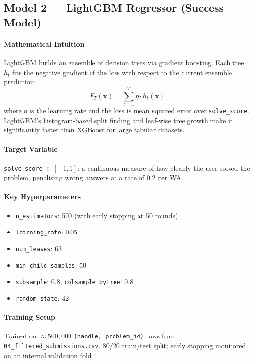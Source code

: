 \documentclass[12pt,a4paper]{article}
\begin{document}
\subsection*{Model 2 --- LightGBM Regressor (Success Model)}

\paragraph{Mathematical Intuition}
LightGBM builds an ensemble of decision trees via gradient boosting. Each tree
$h_t$ fits the negative gradient of the loss with respect to the current
ensemble prediction:
\[
    F_T(\mathbf{x}) = \sum_{t=1}^{T} \eta \cdot h_t(\mathbf{x})
\]
where $\eta$ is the learning rate and the loss is mean squared error over
\texttt{solve\_score}. LightGBM's histogram-based split finding and
leaf-wise tree growth make it significantly faster than XGBoost for large
tabular datasets.

\paragraph{Target Variable}
\texttt{solve\_score} $\in [-1, 1]$: a continuous measure of how cleanly the
user solved the problem, penalising wrong answers at a rate of $0.2$ per WA.

\paragraph{Key Hyperparameters}
\begin{itemize}
    \item \texttt{n\_estimators}: 500 (with early stopping at 50 rounds)
    \item \texttt{learning\_rate}: 0.05
    \item \texttt{num\_leaves}: 63
    \item \texttt{min\_child\_samples}: 50
    \item \texttt{subsample}: 0.8, \texttt{colsample\_bytree}: 0.8
    \item \texttt{random\_state}: 42
\end{itemize}

\paragraph{Training Setup}
Trained on ${\approx}500{,}000$ \texttt{(handle, problem\_id)} rows from
\texttt{04\_filtered\_submissions.csv}. 80/20 train/test split; early stopping
monitored on an internal validation fold.
\end{document}
